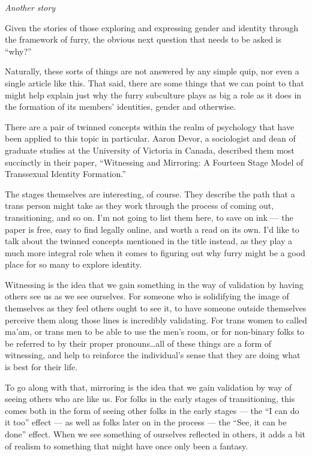 \secdiv

\begin{center}
  \textit{Another story}
\end{center}

\secdiv

Given the stories of those exploring and expressing gender and identity through the framework of furry, the obvious next question that needs to be asked is ``why?''

Naturally, these sorts of things are not answered by any simple quip, nor even a single article like this.  That said, there are some things that we can point to that might help explain just why the furry subculture plays as big a role as it does in the formation of its members' identities, gender and otherwise.

There are a pair of twinned concepts within the realm of psychology that have been applied to this topic in particular.  Aaron Devor, a sociologist and dean of graduate studies at the University of Victoria in Canada, described them most succinctly in their paper, ``Witnessing and Mirroring: A Fourteen Stage Model of Transsexual Identity Formation.''

The stages themselves are interesting, of course.  They describe the path that a trans person might take as they work through the process of coming out, transitioning, and so on.  I'm not going to list them here, to save on ink --- the paper is free, easy to find legally online, and worth a read on its own.  I'd like to talk about the twinned concepts mentioned in the title instead, as they play a much more integral role when it comes to figuring out why furry might be a good place for so many to explore identity.

Witnessing is the idea that we gain something in the way of validation by having others see us as we see ourselves.  For someone who is solidifying the image of themselves as they feel others ought to see it, to have someone outside themselves perceive them along those lines is incredibly validating.  For trans women to called ma'am, or trans men to be able to use the men's room, or for non-binary folks to be referred to by their proper pronouns\ldots{}all of these things are a form of witnessing, and help to reinforce the individual's sense that they are doing what is best for their life.

To go along with that, mirroring is the idea that we gain validation by way of seeing others who are like us.  For folks in the early stages of transitioning, this comes both in the form of seeing other folks in the early stages --- the ``I can do it too'' effect --- as well as folks later on in the process --- the ``See, it can be done'' effect.  When we see something of ourselves reflected in others, it adds a bit of realism to something that might have once only been a fantasy.

